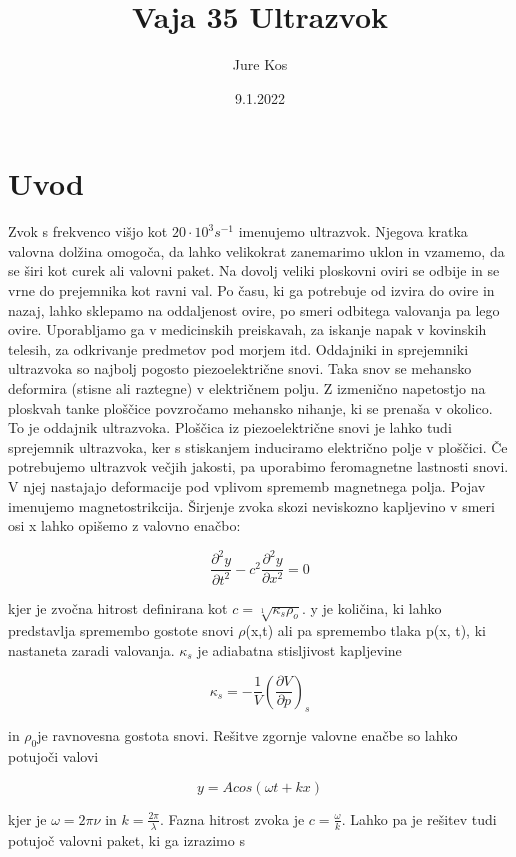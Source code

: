 \documentclass[a4paper]{report}
\author{Jure Kos}
\title{Vaja 35 Ultrazvok}
\date{9.1.2022}
\begin{document}
\maketitle


\chapter*{Uvod}
Zvok s frekvenco višjo kot $20\cdot 10^{3}s^{-1}$  imenujemo ultrazvok. Njegova kratka valovna dolžina omogoča, da lahko velikokrat zanemarimo uklon in vzamemo, da se širi kot curek ali valovni paket. Na dovolj veliki ploskovni oviri se odbije in se vrne do prejemnika kot ravni val. Po času, ki ga potrebuje od izvira do ovire in nazaj, lahko sklepamo na oddaljenost ovire, po smeri odbitega valovanja pa lego ovire. Uporabljamo ga v medicinskih preiskavah, za iskanje napak v kovinskih telesih, za odkrivanje predmetov pod morjem itd. Oddajniki in sprejemniki ultrazvoka so najbolj pogosto piezoelektrične snovi. Taka snov se mehansko deformira (stisne ali raztegne) v električnem polju. Z izmenično napetostjo na ploskvah tanke ploščice povzročamo mehansko nihanje, ki se prenaša v okolico. To je oddajnik ultrazvoka. Ploščica iz piezoelektrične snovi je lahko tudi sprejemnik ultrazvoka, ker s stiskanjem induciramo električno polje v ploščici. Če potrebujemo ultrazvok večjih jakosti, pa uporabimo feromagnetne lastnosti snovi. V njej nastajajo deformacije pod vplivom sprememb magnetnega polja. Pojav imenujemo magnetostrikcija. Širjenje zvoka skozi neviskozno kapljevino v smeri osi x lahko opišemo z valovno enačbo:

\[\frac{\partial^2y}{\partial t^2}-c^2\frac{\partial^2y}{\partial x^2}=0\]

\noindent kjer je zvočna hitrost definirana kot $c =\sqrt[1]{\kappa_s \rho_o}$. y je količina, ki lahko predstavlja
spremembo gostote snovi $\rho$(x,t) ali pa spremembo tlaka p(x, t), ki nastaneta zaradi valovanja. $\kappa_s$ je adiabatna stisljivost kapljevine


\[\kappa_s = -\frac{1}{V}\left(\frac{\partial V}{\partial p}\right)_s\]

\noindent in $\rho_0$je ravnovesna gostota snovi. Rešitve zgornje valovne enačbe so lahko potujoči valovi

\[y=Acos(\omega t + kx)\]

\noindent kjer je $\omega = 2 \pi \nu$ in $k = \frac{2\pi}{\lambda}$. Fazna hitrost zvoka je $c= \frac{\omega}{k}$. Lahko pa je rešitev tudi potujoč valovni paket, ki ga izrazimo s
\end{document}
